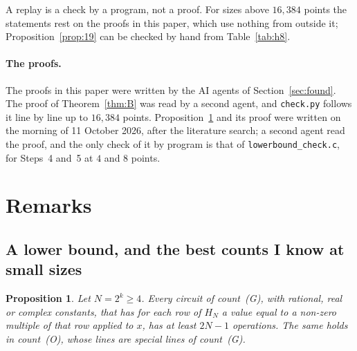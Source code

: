 \documentclass[10pt]{article}
\newtheorem{proposition}{Proposition}
\theoremstyle{remark}
\newcommand{\cntG}{\textup{(G)}}
\newcommand{\cntO}{\textup{(O)}}
\begin{document}
A replay is a check by a program, not a proof. For sizes above $16{,}384$ points the statements rest on
the proofs in this paper, which use nothing from outside it; Proposition~\ref{prop:19} can be checked by
hand from Table~\ref{tab:h8}.

\paragraph{The proofs.}
The proofs in this paper were written by the AI agents of Section~\ref{sec:found}. The proof of
Theorem~\ref{thm:B} was read by a second agent, and \verb|check.py| follows it line by line up to $16{,}384$
points. Proposition~\ref{prop:lower} and its proof were written on the morning of 11 October 2026, after the
literature search; a second agent read the proof, and the only check of it by program is that of
\verb|lowerbound_check.c|, for Steps~4 and~5 at $4$ and $8$ points.

\section{Remarks}\label{sec:remarks}

\subsection*{A lower bound, and the best counts I know at small sizes}

\begin{proposition}\label{prop:lower}
Let $N=2^k\ge4$. Every circuit of count~\cntG, with rational, real or complex constants, that has for each row
of $H_N$ a value equal to a non-zero multiple of that row applied to $x$, has at least $2N-1$ operations. The
same holds in count~\cntO, whose lines are special lines of count~\cntG.
\end{proposition}
\end{document}
